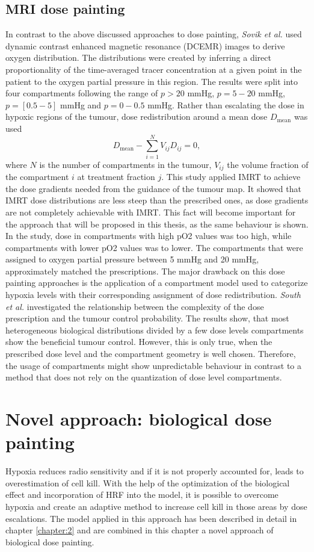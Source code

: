 \subsection{MRI dose painting}
In contrast to the above discussed approaches to dose painting, \textit{Sovik et al.} \cite{pmid17674980} used dynamic contrast enhanced magnetic resonance (DCEMR) images to derive oxygen distribution. The distributions were created by inferring a direct proportionality of the time-averaged tracer concentration at a given point in the patient to the oxygen partial pressure in this region. The results were split into four compartments following the range of $p>20$ mmHg, $p=5-20$ mmHg, $p=[0.5-5]$ mmHg and $p = 0-0.5$ mmHg. Rather than escalating the dose in hypoxic regions of the tumour, dose redistribution around a mean dose $D_\mathrm{mean}$ was used
\begin{equation}
D_\mathrm{mean} - \sum\limits_{i=1}^NV_{ij}D_{ij} = 0,
\end{equation}
where $N$ is the number of compartments in the tumour, $V_{ij}$ the volume fraction of the compartment $i$ at treatment fraction $j$. This study applied IMRT to achieve the dose gradients needed from the guidance of the tumour map. It showed that IMRT dose distributions are less steep than the prescribed ones, as dose gradients are not completely  achievable with IMRT. This fact will become important for the approach that will be proposed in this thesis, as the same behaviour is shown. In the study, dose in compartments with high pO2 values was too high, while compartments with lower pO2 values was to lower. The compartments that were assigned to oxygen partial pressure between 5 mmHg and 20 mmHg, approximately matched the prescriptions. The major drawback on this dose painting approaches is the application of a compartment model used to categorize hypoxia levels with their corresponding assignment of dose redistribution. \textit{South et al.} \cite{pmid19928068} investigated the relationship between the complexity of the dose prescription and the tumour control probability. The results show, that most heterogeneous biological distributions divided by a few dose levels compartments show the beneficial tumour control. However, this is only true, when the prescribed dose level and the compartment geometry is well chosen. Therefore, the usage of compartments might show unpredictable behaviour in contrast to a method that does not rely on the quantization of dose level compartments.
\section{Novel approach: biological dose painting}
Hypoxia reduces radio sensitivity and if it is not properly accounted for, leads to overestimation of cell kill. With the help of the optimization of the biological effect and incorporation of HRF into the model, it is possible to overcome hypoxia and create an adaptive method to increase cell kill in those areas by dose escalations. The model applied in this approach has been described in detail in chapter \ref{chapter:2} and are combined in this chapter a novel approach of biological dose painting.
